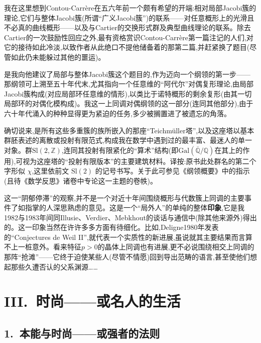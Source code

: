 
我在这里想到Contou-Carrère在五六年前一个颇有希望的开端:相对局部Jacobi簇的理论,它们与整体Jacobi簇(所谓“广义Jacobi簇”)的联系——对任意概形上的光滑且不必真的曲线概形——以及与Cartier的交换形式群及典型曲线理论的联系。除去Cartier的一次鼓励性回应之外,最有资格赏识Contou-Carrère第一篇注记的人们,对它的接待如此冷淡,以致作者从此绝口不提他储备着的那第二篇,并赶紧换了题目(尽管如此仍未能躲过其他的噩运)。

是我向他建议了局部与整体Jacobi簇这个题目的,作为迈向一个纲领的第一步——那纲领可上溯至五十年代末,尤其指向一个任意维的“阿代尔”对偶复形理论,由局部Jacobi簇构成(对应局部环\dmark{}任意维的情形),以类比于诺特概形的剩余复形(由其一切局部环的对偶化模构成)。我这一上同调对偶纲领的这一部分(连同其他部分),由于六十年代涌入的种种显得更为紧迫的任务,多少被搁置进了被遗忘的角落。


确切说来,是所有这些多重簇的族所嵌入的那座“Teichmüller塔”,以及这座塔以基本群胚表述的离散或投射有限范式,构成我在数学中遇到过的最丰富、最迷人的单一对象。群$\mathrm{Sl}(2,\mathbb{Z})$,连同其投射有限紧化的“算术”结构(即$\mathrm{Gal}(\overline{\mathbb{Q}}/\mathbb{Q})$在其上的作用),可视为这座塔的“投射有限版本”的主要建筑材料。译按:原书此处群名的第二个字形似 $\chi$,这里依前文 $\mathrm{Sl}(2)$ 的记号书写。关于此可参见《纲领概要》中的指示(且待《数学反思》诸卷中专论这一主题的卷帙)。


这一“阴郁停滞”的观察,并不是一个对近十年间围绕概形与代数簇上同调的主要事件了如指掌的人深思熟虑的意见。这是一个“局外人”的单纯的整体\textbf{印象},它是我1982与1983年间同Illusie、Verdier、Mebkhout的谈话与通信中(除其他来源外)得出的。这一印象当然在许许多多方面有待细化。比如,Deligne1980年发表的“Conjectures de Weil II”,就代表一个实质性的新进展,虽说就其主要结果而言算不上一桩意外。看来特征$p>0$的晶体上同调也有进展,更不必说围绕相交上同调的那阵“抢滩”——它终于迫使某些人(尽管不情愿)回到导出范畴的语言,甚至使他们想起那些久遭否认的父系渊源……

\section{III.~时尚——或名人的生活}

\subsection{1.~本能与时尚——或强者的法则}

